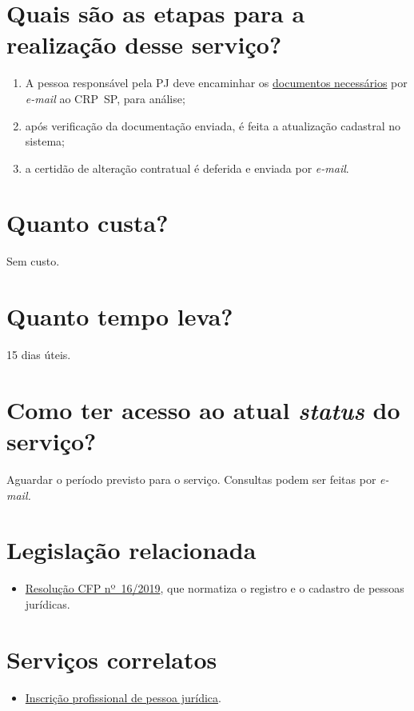 \section{Quais são as etapas para a realização desse serviço?}

\begin{enumerate}
  \item  A pessoa responsável pela PJ deve encaminhar os  \href{https://www.crpsp.org/pagina/view/320}{documentos necessários}  por \emph{e-mail} ao CRP~SP, para análise;
  \item  após verificação da documentação enviada, é feita a atualização  cadastral no sistema;
  \item  a certidão de alteração contratual é deferida e enviada por  \emph{e-mail}.
\end{enumerate}

\section{Quanto custa?}

Sem custo.

\section{Quanto tempo leva?}

15 dias úteis.

\section{Como ter acesso ao atual \emph{status} do serviço?}

Aguardar o período previsto para o serviço. Consultas podem ser feitas por \emph{e-mail.}

\section{Legislação relacionada}

\begin{itemize}
  \item  \href{https://atosoficiais.com.br/cfp/resolucao-administrativa-financeira-n-16-2019-altera-o-manual-de-procedimentos-administrativo-e-financeiro-do-sistema-conselhos-de-psicologia-anexo-da-resolucao-cfp-n-202018-a-resolucao-cfp-n-03-2007-a-resolucao-cfp-n-16-2019-e-da-outras-providencias}{Resolução  CFP nº~16/2019}, que normatiza o registro e o cadastro de pessoas  jurídicas.
\end{itemize}

\section{Serviços correlatos}

\begin{itemize}
  \item  \hyperref[chap:pj-inscricao]{Inscrição  profissional de pessoa jurídica}.
\end{itemize}

\sumario